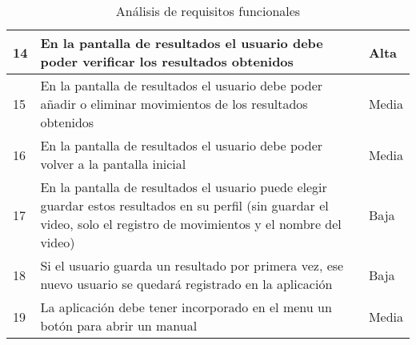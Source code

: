 \begin{table}[H]
\begin{center}
\begin{tabular}{p{} | p{} p{}}
            \hline
            14& En la pantalla de resultados el usuario debe poder verificar los resultados obtenidos & Alta\\
            \hline
            15& En la pantalla de resultados el usuario debe poder añadir o eliminar movimientos de los resultados obtenidos & Media\\
            \hline
            16& En la pantalla de resultados el usuario debe poder volver a la pantalla inicial & Media\\
            \hline
            17& En la pantalla de resultados el usuario puede elegir guardar estos resultados en su perfil (sin guardar el video, solo el registro de movimientos y el nombre del video) & Baja\\
            \hline
            18& Si el usuario guarda un resultado por primera vez, ese nuevo usuario se quedará registrado en la aplicación  & Baja\\
            \hline
            19& La aplicación debe tener incorporado en el menu un botón para abrir un manual  & Media\\
            \hline
        \end{tabular} 
    \end{center}
    \caption{Análisis de requisitos funcionales}
    \label{ReqFuncionales}
\end{table}

